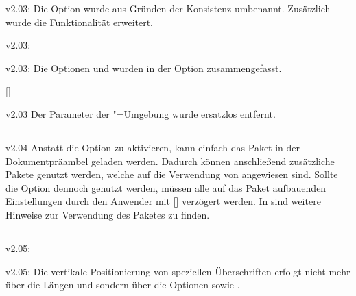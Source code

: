 \begin{Obsolete}{v2.03:}{}
\printobsoletelist%
%
Die Option  wurde aus Gründen der Konsistenz umbenannt. 
Zusätzlich wurde die Funktionalität erweitert.
\end{Obsolete}

\begin{Obsolete}{v2.03:}{}
\begin{Obsolete}{v2.03:}{}
\printobsoletelist%
%
Die Optionen  und  wurden in der Option 
 zusammengefasst.
\end{Obsolete}
\end{Obsolete}

\begin{Obsolete}{}{[]}
\begin{Obsolete}{v2.03}{}
\printobsoletelist%
%
Der Parameter  der 
"=Umgebung wurde ersatzlos entfernt.
\end{Obsolete}
\end{Obsolete}


\subsection{}
\begin{Obsolete}{v2.04}{}%
\printobsoletelist%
%
Anstatt die Option  zu aktivieren, kann einfach das Paket 
 in der Dokumentpräambel geladen werden. Dadurch können 
anschließend zusätzliche Pakete genutzt werden, welche auf die Verwendung von 
 angewiesen sind. Sollte die Option  
dennoch genutzt werden, müssen alle auf das Paket  
aufbauenden Einstellungen durch den Anwender mit 
[\PParameter{\dots}] 
verzögert werden. In  sind weitere Hinweise zur Verwendung 
des Paketes  zu finden.
\end{Obsolete}


\subsection{}
\begin{Obsolete}{v2.05:}{}
\begin{Obsolete}{v2.05:}{}
\printobsoletelist%
%
Die vertikale Positionierung von speziellen Überschriften erfolgt nicht mehr 
über die Längen  und  sondern 
über die Optionen  sowie .
\end{Obsolete}
\end{Obsolete}


